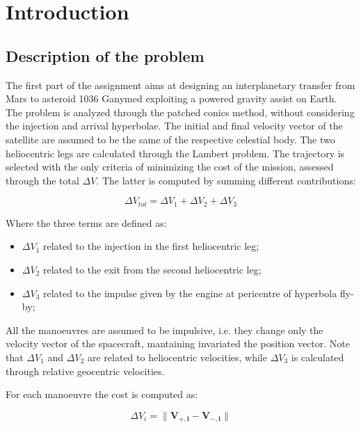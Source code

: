 \section{Introduction}
\label{sec:introduction}

\subsection{Description of the problem}
\label{subsec:description}

The first part of the assignment aims at designing an interplanetary transfer from Mars to asteroid 1036 Ganymed exploiting a powered gravity assist on Earth. The problem is analyzed through the patched conics method, without considering the injection and arrival hyperbolae. The initial and final velocity vector of the satellite are assumed to be the same of the respective celestial body. The two heliocentric legs are calculated through the Lambert problem. The trajectory is selected with the only criteria of minimizing the cost of the mission, assessed through the total $\Delta V$. The latter is computed by summing different contributions:

\begin{equation}
    \Delta V_{tot}= \Delta V_1 + \Delta V_2 + \Delta V_3
\end{equation}

Where the three terms are defined as:

\begin{itemize}
    [wide,itemsep=3pt,topsep=3pt]
    \item $\Delta V_1$ related to the injection in the first heliocentric leg;
    \item $\Delta V_2$ related to the exit from the second heliocentric leg;
    \item $\Delta V_3$ related to the impulse given by the engine at pericentre of hyperbola fly-by;
\end{itemize}

All the manoeuvres are assumed to be impulsive, i.e. they change only the velocity vector of the spacecraft, mantaining invariated the position vector. Note that $\Delta V_{1}$ and $\Delta V_{2}$ are related to heliocentric velocities, while $\Delta V_{3}$ is calculated through relative geocentric velocities. 

For each manoeuvre the cost is computed as:

\begin{equation}
    \Delta V_i= \lVert \boldsymbol{V_{+,i}} - \boldsymbol{V_{-,i}} \rVert
\end{equation}

